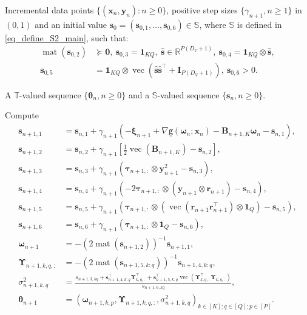 \documentclass{article}
\newcommand{\mdg}{softmax-gated Gaussian MoE }
\newcommand{\zero}{\ensuremath{\mathbf{0}}}
\DeclareMathOperator*{\vect}{vec} %
\DeclareMathOperator*{\mat}{mat}
\def\param{\vtheta}
\def\sfg{\mathsf{g}}
\newcommand{\ooint}[1]{\left(#1\right)}%
\def\vxi{{\bm{\xi}}}
\def\vtau{{\bm{\tau}}}
\def\vomega{{\bm{\omega}}}
\def\vtheta{{\bm{\theta}}}
\def\vr{{\bm{r}}}
\def\vs{{\bm{s}}}
\def\vx{{\bm{x}}}
\def\vy{{\bm{y}}}
\def\mB{{\bm{B}}}
\def\mI{{\bm{I}}}
\def\mUpsilon{{\bm{\Upsilon}}}
\def\sS{{\mathbb{S}}}
\def\sT{{\mathbb{T}}}
\newcommand{\R}{\mathbb{R}}
\begin{document}
\begin{algorithm}[H]
\caption{Incremental stochastic MM algorithm for \mdg models}
\label{algorithm_onlineMM_MoE}
\begin{algorithmic}[1]
    \Require Incremental data points $\{(\vx_{n},\vy_{n}):n \ge 0\}$, positive step sizes $\{\gamma_{n+1}, n \geq 1 \}$ in  $\ooint{0,1}$ and an initial value $\vs_0 = (\vs_{0,1},\ldots,\vs_{0,6}) \in \sS$, where $\sS$ is defined in \cref{eq_define_S2_main}, such that:
    \begin{align*}
        \mat(\vs_{0,2})&\succeq \zero,~\vs_{0,3}=\bm{1}_{KQ},~\widehat{\vs} \in \R^{P(D_V+1)},~\vs_{0,4}=\textbf{1}_{KQ}\otimes\widehat{\vs},\\
        \vs_{0,5}&=\textbf{1}_{KQ}\otimes \vect(\widehat{\vs}\widehat{\vs}^{\top}+\mI_{P(D_V+1)}),~\vs_{0,6}>0.
    \end{align*}
    
    \Ensure A $\sT$-valued sequence $\{\param_n, n \ge 0\}$ and a $\sS$-valued sequence $\{\vs_n, n \ge 0\}$.

        \State Compute
            \begin{align*}
            \vs_{n+1,1}&=\vs_{n,1}+\gamma_{n+1}\left(-\vxi_{n+1}+\nabla \underline{\sfg}(\vomega_{n};\vx_n)-\mB_{n+1,K}\vomega_{n}-\vs_{n,1}\right),\\
            \vs_{n+1,2}&=\vs_{n,2}+\gamma_{n+1}\left[\frac{1}{2}\vect\left(\mB_{n+1,K}\right)-\vs_{n,2}\right],\\
            \vs_{n+1,3}&=\vs_{n,3}+\gamma_{n+1}\left(\vtau_{n+1,:}\otimes \vy_{n+1}^{2}-\vs_{n,3}\right),\\  
            \vs_{n+1,4}&=\vs_{n,4}+\gamma_{n+1}\left(-2\vtau_{n+1,:}\otimes(\vy_{n+1}\otimes\vr_{n+1})-\vs_{n,4}\right), \\
            \vs_{n+1,5}&=\vs_{n,5}+\gamma_{n+1}\left(\vtau_{n+1,:}\otimes\left(\vect\left(\vr_{n+1}\vr_{n+1}^{\top}\right)\otimes \mathbf{1}_Q\right)-\vs_{n,5}\right),\\
            \vs_{n+1,6}&=\vs_{n,6}+\gamma_{n+1}\left(\vtau_{n+1,:}\otimes \mathbf{1}_Q-\vs_{n,6}\right), \\
       \vomega_{n+1} &= -\left(2\mat(\vs_{n+1,2}) \right)^{-1} \vs_{n+1,1},\\
        \mUpsilon_{n+1,k,q,:}&=-\left(2\mat\left(\vs_{n+1,5,k:q}\right)\right)^{-1}\vs_{n+1,4,k:q},\\
        \sigma_{n+1,k,q}^{2}&=\frac{s_{n+1,3,kq}+\vs_{n+1,4,k:q}^{\top}\mUpsilon_{k,q,:}^{\top}+\vs_{n+1,5,k:q}^{\top}\vect(\mUpsilon_{k,q,:}^{\top}\mUpsilon_{k,q,:})}{s_{n+1,6,kq}},\\
        \vtheta_{n+1} &= \left(\vomega_{n+1,k,p}, \mUpsilon_{n+1,k,q,:}, \sigma_{n+1,k,q}^{2}\right)_{k \in [K];q\in[Q];p\in [P]}.
        \end{align*}
    \EndFor
\end{algorithmic}
\end{algorithm}
\end{document}
